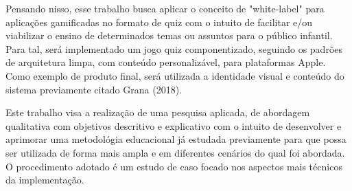 Pensando nisso, esse trabalho busca aplicar o conceito de "white-label" para aplicações gamificadas no formato de quiz com o intuito de facilitar e/ou viabilizar o ensino de determinados temas ou assuntos para o público infantil. Para tal, será implementado um jogo quiz componentizado, seguindo os padrões de arquitetura limpa, com conteúdo personalizável, para plataformas Apple. Como exemplo de produto final, será utilizada a identidade visual e conteúdo do sistema previamente citado Grana (2018).

Este trabalho visa a realização de uma pesquisa aplicada, de abordagem qualitativa com objetivos descritivo e explicativo com o intuito de desenvolver e aprimorar uma metodológia educacional já estudada previamente para que possa ser utilizada de forma mais ampla e em diferentes cenários do qual foi abordada. O procedimento adotado é um estudo de caso focado nos aspectos mais técnicos da implementação.